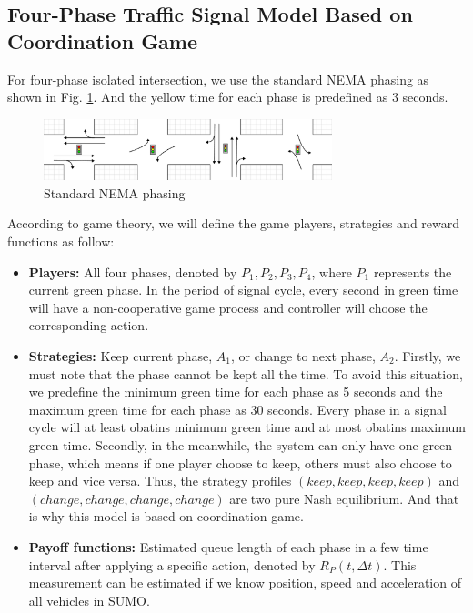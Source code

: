 \documentclass[a4paper, 10pt, conference]{ieeeconf}      %
\begin{document}
\subsection{Four-Phase Traffic Signal Model Based on Coordination Game}
For four-phase isolated intersection, we use the standard NEMA phasing as shown in Fig. \ref{fig:NEMA}. And the yellow time for each phase 
is predefined as 3 seconds.
\begin{figure}[thpb]
        \centering
        \includegraphics[width=3.3in]{figures/NEMA.PNG}
        \caption{Standard NEMA phasing}
        \label{fig:NEMA}
\end{figure}
According to game theory, we will define the game players, strategies and reward functions as follow:
\begin{itemize}
        \item \textbf{Players:} All four phases, denoted by $P_1,P_2,P_3,P_4$, where $P_1$ represents the current green phase. 
        In the period of signal cycle, every second in green 
        time will have a non-cooperative game process and controller will choose the corresponding action.
        \item \textbf{Strategies:} Keep current phase, $A_1$, or change to next phase, $A_2$. Firstly, we must note that the phase cannot be 
        kept all the time. To avoid this situation, 
        we predefine the minimum green time for each phase as 5 seconds and the maximum green time for each phase as 30 seconds. 
        Every phase in a signal cycle
        will at least obatins minimum green time and at most obatins maximum green time. Secondly, in the meanwhile, the system can only have one green phase, which
        means if one player choose to keep, others must also choose to keep and vice versa. Thus, the strategy profiles $(keep,keep,keep,keep)$ and 
        $(change,change,change,change)$ are two pure Nash equilibrium. And that is why this model is based on coordination game.
        \item \textbf{Payoff functions:} Estimated queue length of each phase in a few time interval after applying a specific action, denoted by $R_P(t,\Delta t)$. 
        This measurement can be estimated if we know position, speed and acceleration of all vehicles in SUMO. 
\end{itemize}
\end{document}
